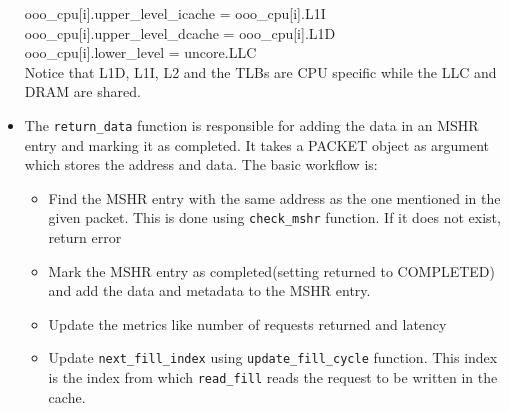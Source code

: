 \documentclass[11pt, swedish, openany]{book}
\begin{document}
\begin{itemize}
    ooo\_cpu[i].upper\_level\_icache = ooo\_cpu[i].L1I\\
    ooo\_cpu[i].upper\_level\_dcache = ooo\_cpu[i].L1D\\
    ooo\_cpu[i].lower\_level = uncore.LLC\\
    Notice that L1D, L1I, L2 and the TLBs are CPU specific while the LLC and DRAM are shared. 
    \item The \texttt{return\_data} function is responsible for adding the data in an MSHR entry and marking it as completed. It takes a PACKET object as argument which stores the address and data. The basic workflow is: 
    \begin{itemize}
        \item Find the MSHR entry with the same address as the one mentioned in the given packet. This is done using \texttt{check\_mshr} function. If it does not exist, return error
        \item Mark the MSHR entry as completed(setting returned to COMPLETED) and add the data and metadata to the MSHR entry.
        \item Update the metrics like number of requests returned and latency
        \item Update \texttt{next\_fill\_index} using \texttt{update\_fill\_cycle} function. This index is the index from which \texttt{read\_fill} reads the request to be written in the cache.
    \end{itemize}
\end{itemize}

\end{document}
